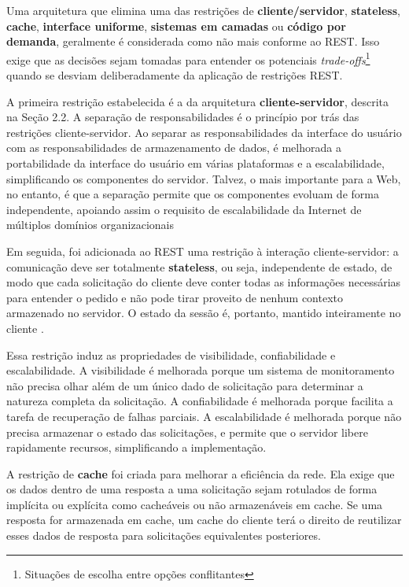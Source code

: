 Uma arquitetura que elimina uma das restrições de \textbf{cliente/servidor}, \textbf{stateless}, \textbf{cache}, \textbf{interface uniforme}, \textbf{sistemas em camadas} ou \textbf{código por demanda}, geralmente é considerada como não mais conforme ao REST. Isso exige que as decisões sejam tomadas para entender os potenciais \textit{trade-offs}\footnote{Situações de escolha entre opções conflitantes} quando se desviam deliberadamente da aplicação de restrições REST. 

A primeira restrição estabelecida é a da arquitetura \textbf{cliente-servidor}, descrita na Seção 2.2. A separação de responsabilidades é o princípio por trás das restrições cliente-servidor. Ao separar as responsabilidades da interface do usuário com as responsabilidades de armazenamento de dados, é melhorada a portabilidade da interface do usuário em várias plataformas e a escalabilidade, simplificando os componentes do servidor. Talvez, o mais importante para a Web, no entanto, é que a separação permite que os componentes evoluam de forma independente, apoiando assim o requisito de escalabilidade da Internet de múltiplos domínios organizacionais \cite{rest-thesis}

Em seguida, foi adicionada ao REST uma restrição à interação cliente-servidor: a comunicação deve ser totalmente \textbf{stateless}, ou seja, independente de estado, de modo que cada solicitação do cliente deve conter todas as informações necessárias para entender o pedido e não pode tirar proveito de nenhum contexto armazenado no servidor. O estado da sessão é, portanto, mantido inteiramente no cliente \cite{rest-thesis}.

Essa restrição induz as propriedades de visibilidade, confiabilidade e escalabilidade. A visibilidade é melhorada porque um sistema de monitoramento não precisa olhar além de um único dado de solicitação para determinar a natureza completa da solicitação. A confiabilidade é melhorada porque facilita a tarefa de recuperação de falhas parciais. A escalabilidade é melhorada porque não precisa armazenar o estado das solicitações, e permite que o servidor libere rapidamente recursos, simplificando a implementação.

A restrição de \textbf{cache} foi criada para melhorar a eficiência da rede. Ela exige que os dados dentro de uma resposta a uma solicitação sejam rotulados de forma implícita ou explícita como cacheáveis ou não armazenáveis em cache. Se uma resposta for armazenada em cache, um cache do cliente terá o direito de reutilizar esses dados de resposta para solicitações equivalentes posteriores.

